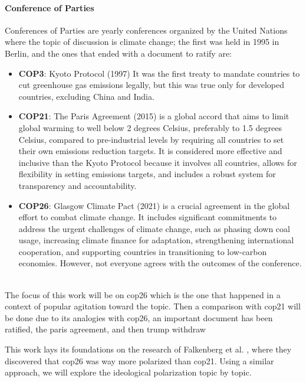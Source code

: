 \paragraph{Conference of Parties}
Conferences of Parties are yearly conferences organized by the United Nations where the topic of discussion is climate change; the first was held in 1995 in Berlin, and the ones that ended with a document to ratify are:
\begin{itemize}
    \item \textbf{COP3}: Kyoto Protocol (1997) It was the first treaty to mandate countries to cut greenhouse gas emissions legally, but this was true only for developed countries, excluding China and India.
    \item \textbf{COP21}: The Paris Agreement (2015) is a global accord that aims to limit global warming to well below 2 degrees Celsius, preferably to 1.5 degrees Celsius, compared to pre-industrial levels by requiring all countries to set their own emissions reduction targets. It is considered more effective and inclusive than the Kyoto Protocol because it involves all countries, allows for flexibility in setting emissions targets, and includes a robust system for transparency and accountability.
    \item \textbf{COP26}: Glasgow Climate Pact (2021) is a crucial agreement in the global effort to combat climate change. It includes significant commitments to address the urgent challenges of climate change, such as phasing down coal usage, increasing climate finance for adaptation, strengthening international cooperation, and supporting countries in transitioning to low-carbon economies. However, not everyone agrees with the outcomes of the conference. \cite{arora_cop26_2021} \cite{layna_promises_2022} \cite{suresh_climate_2021}
\end{itemize}

\\
The focus of this work will be on cop26 which is the one that happened in a context of popular agitation toward the topic. Then a comparison with cop21 will be done due to its analogies with cop26, an important document has been ratified, the paris agreement, and then trump withdraw 


This work lays its foundations on the research of Falkenberg et al. \cite{falkenberg_growing_2022}, where they discovered that cop26 was way more polarized than cop21. Using a similar approach, we will explore the ideological polarization topic by topic. 

